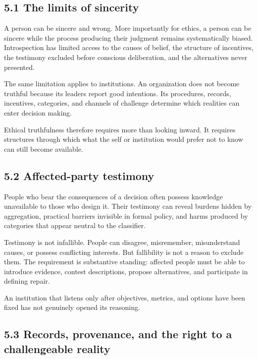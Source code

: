 \documentclass[
  11pt,
]{article}
\begin{document}
\subsection{5.1 The limits of sincerity}\label{the-limits-of-sincerity}

A person can be sincere and wrong. More importantly for ethics, a person
can be sincere while the process producing their judgment remains
systematically biased. Introspection has limited access to the causes of
belief, the structure of incentives, the testimony excluded before
conscious deliberation, and the alternatives never presented.

The same limitation applies to institutions. An organization does not
become truthful because its leaders report good intentions. Its
procedures, records, incentives, categories, and channels of challenge
determine which realities can enter decision making.

Ethical truthfulness therefore requires more than looking inward. It
requires structures through which what the self or institution would
prefer not to know can still become available.

\subsection{5.2 Affected-party
testimony}\label{affected-party-testimony}

People who bear the consequences of a decision often possess knowledge
unavailable to those who design it. Their testimony can reveal burdens
hidden by aggregation, practical barriers invisible in formal policy,
and harms produced by categories that appear neutral to the classifier.

Testimony is not infallible. People can disagree, misremember,
misunderstand causes, or possess conflicting interests. But fallibility
is not a reason to exclude them. The requirement is substantive
standing: affected people must be able to introduce evidence, contest
descriptions, propose alternatives, and participate in defining repair.

An institution that listens only after objectives, metrics, and options
have been fixed has not genuinely opened its reasoning.

\subsection{5.3 Records, provenance, and the right to a challengeable
reality}\label{records-provenance-and-the-right-to-a-challengeable-reality}
\end{document}
